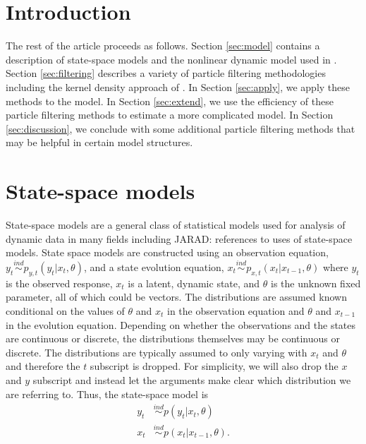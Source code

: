 \documentclass{article}
\newcommand{\jarad}[1]{{\color{red}JARAD: #1}}
\begin{document}
\section{Introduction}

The rest of the article proceeds as follows. Section \ref{sec:model} contains a description of state-space models and the nonlinear dynamic model used in \citet{skvortsov2012monitoring}. Section \ref{sec:filtering} describes a variety of particle filtering methodologies including the kernel density approach of \cite{Liu:West:comb:2001}. In Section \ref{sec:apply}, we apply these methods to the \citet{skvortsov2012monitoring} model. In Section \ref{sec:extend}, we use the efficiency of these particle filtering methods to estimate a more complicated model. In Section \ref{sec:discussion}, we conclude with some additional particle filtering methods that may be helpful in certain model structures.

\section{State-space models \label{sec:model}}

State-space models are a general class of statistical models used for analysis of dynamic data in many fields including \jarad{references to uses of state-space models}. State space models are constructed using an observation equation, $y_t \stackrel{ind}{\sim} p_{y,t}(y_t|x_t,\theta)$, and a state evolution equation, $x_t \stackrel{ind}{\sim} p_{x,t}(x_t|x_{t-1},\theta)$ where $y_t$ is the observed response, $x_t$ is a latent, dynamic state, and $\theta$ is the unknown fixed parameter, all of which could be vectors. The distributions are assumed known conditional on the values of $\theta$ and $x_t$ in the observation equation and $\theta$ and $x_{t-1}$ in the evolution equation. Depending on whether the observations and the states are continuous or discrete, the distributions themselves may be continuous or discrete. The distributions are typically assumed to only varying with $x_t$ and $\theta$ and therefore the $t$ subscript is dropped. 
For simplicity, we will also drop the $x$ and $y$ subscript and instead let the arguments make clear which distribution we are referring to. Thus, the state-space model is 
\begin{align*}
y_t &\stackrel{ind}{\sim} p(y_t|x_t,\theta) \\
x_t &\stackrel{ind}{\sim} p(x_t|x_{t-1},\theta).
\end{align*}
\end{document}
